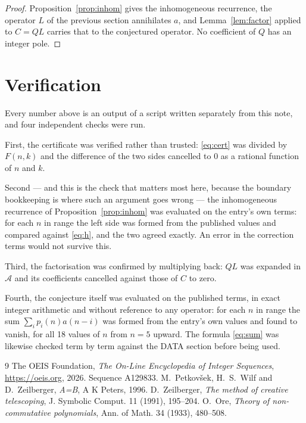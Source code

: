 \documentclass[11pt,a4paper]{article}
\theoremstyle{plain}
\theoremstyle{definition}
\begin{document}
\begin{proof}
Proposition~\ref{prop:inhom} gives the inhomogeneous recurrence, the operator $L$ of the
previous section annihilates $a$, and Lemma~\ref{lem:factor} applied to $C=QL$ carries that
to the conjectured operator. No coefficient of $Q$ has an integer pole.
\end{proof}

\section{Verification}

Every number above is an output of a script written separately from this note, and four
independent checks were run.

First, the certificate was verified rather than trusted: \eqref{eq:cert} was divided by
$F(n,k)$ and the difference of the two sides cancelled to $0$ as a rational function of $n$
and $k$.

Second --- and this is the check that matters most here, because the boundary bookkeeping
is where such an argument goes wrong --- the inhomogeneous recurrence of
Proposition~\ref{prop:inhom} was evaluated on the entry's own terms: for each $n$ in range
the left side was formed from the published values and compared against \eqref{eq:h}, and
the two agreed exactly. An error in the correction terms would not survive this.

Third, the factorisation was confirmed by multiplying back: $QL$ was expanded in
$\mathcal{A}$ and its coefficients cancelled against those of $C$ to zero.

Fourth, the conjecture itself was evaluated on the published terms, in exact integer
arithmetic and without reference to any operator: for each $n$ in range the sum
$\sum_{i}p_{i}(n)a(n-i)$ was formed from the entry's own values and found to vanish, for
all 18 values of $n$ from $n=5$ upward. The formula \eqref{eq:sum} was
likewise checked term by term against the DATA section before being used.

\begin{thebibliography}{9}
 The OEIS Foundation, \emph{The On-Line Encyclopedia of Integer Sequences},
\url{https://oeis.org}, 2026. Sequence A129833.
 M.~Petkov\v{s}ek, H.~S.~Wilf and D.~Zeilberger, \emph{A=B}, A K Peters,
1996.
 D.~Zeilberger, \emph{The method of creative telescoping}, J. Symbolic
Comput. 11 (1991), 195--204.
 O.~Ore, \emph{Theory of non-commutative polynomials}, Ann. of Math. 34
(1933), 480--508.
\end{thebibliography}
\end{document}
